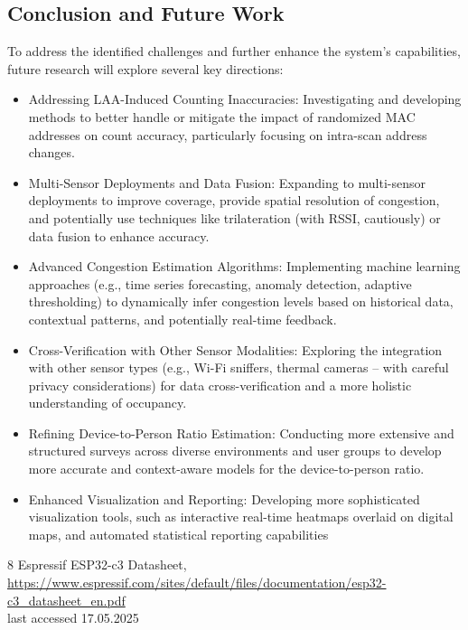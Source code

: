 \documentclass[runningheads]{llncs}
\begin{document}
\subsection{Conclusion and Future Work}
 To address the identified challenges and further enhance the system's capabilities, future research will explore several key directions:
\begin{itemize}
    \item    Addressing LAA-Induced Counting Inaccuracies: Investigating and developing methods to better handle or mitigate the impact of randomized MAC addresses on count accuracy, particularly focusing on intra-scan address changes.

   \item  Multi-Sensor Deployments and Data Fusion: Expanding to multi-sensor deployments to improve coverage, provide spatial resolution of congestion, and potentially use techniques like trilateration (with RSSI, cautiously) or data fusion to enhance accuracy.

    \item Advanced Congestion Estimation Algorithms: Implementing machine learning approaches (e.g., time series forecasting, anomaly detection, adaptive thresholding) to dynamically infer congestion levels based on historical data, contextual patterns, and potentially real-time feedback.

    \item Cross-Verification with Other Sensor Modalities: Exploring the integration with other sensor types (e.g., Wi-Fi sniffers, thermal cameras – with careful privacy considerations) for data cross-verification and a more holistic understanding of occupancy.

    \item Refining Device-to-Person Ratio Estimation: Conducting more extensive and structured surveys across diverse environments and user groups to develop more accurate and context-aware models for the device-to-person ratio.

    \item Enhanced Visualization and Reporting: Developing more sophisticated visualization tools, such as interactive real-time heatmaps overlaid on digital maps, and automated statistical reporting capabilities
\end{itemize}
\begin{credits}
\end{credits}
%
%
%
% 
% 
%
\begin{thebibliography}{8}
Espressif ESP32-c3 Datasheet,\\
\url{https://www.espressif.com/sites/default/files/documentation/esp32-c3\_datasheet\_en.pdf}\\
last accessed 17.05.2025
\end{thebibliography}
\end{document}
